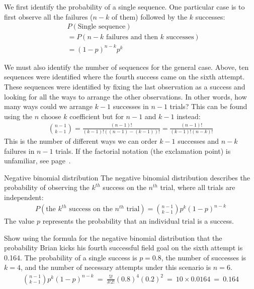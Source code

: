 We first identify the probability of a single sequence. One particular case is to first observe all the failures ($n-k$ of them) followed by the $k$ successes:
\begin{align*}
&P(\text{Single sequence}) \\
&= P(\text{$n-k$ failures and then $k$ successes}) \\
&= (1-p)^{n-k} p^{k}
\end{align*}

We must also identify the number of sequences for the general case. Above, ten sequences were identified where the fourth success came on the sixth attempt. These sequences were identified by fixing the last observation as a success and looking for all the ways to arrange the other observations. In other words, how many ways could we arrange $k-1$ successes in $n-1$ trials? This can be found using the $n$ choose $k$ coefficient but for $n-1$ and $k-1$ instead:
\begin{align*}
{n-1 \choose k-1} = \frac{(n-1)!}{(k-1)! \left((n-1) - (k-1)\right)!} = \frac{(n-1)!}{(k-1)! \left(n - k\right)!}
\end{align*}
This is the number of different ways we can order $k-1$ successes and $n-k$ failures in $n-1$ trials. If the factorial notation (the exclamation point) is unfamiliar, see page~\pageref{factorialDefinitionInTheBinomialSection}.

\begin{onebox}{Negative binomial distribution}
  The negative binomial distribution describes the
  probability of observing the $k^{th}$ success on
  the $n^{th}$ trial, where all trials are independent:
  \begin{align*}
  P(\text{the $k^{th}$ success on the $n^{th}$ trial})
      = {n-1 \choose k-1} p^{k}(1-p)^{n-k}
  \end{align*}
  The value $p$ represents the probability that
  an individual trial is a success.
\end{onebox}

\begin{examplewrap}
\begin{nexample}{Show using the formula for the negative binomial distribution that the probability Brian kicks his fourth successful field goal on the sixth attempt is 0.164.}
The probability of a single success is $p=0.8$, the number of successes is $k=4$, and the number of necessary attempts under this scenario is $n=6$.
\begin{align*}
{n-1 \choose k-1}p^k(1-p)^{n-k}\ 
	=\ \frac{5!}{3!2!} (0.8)^4 (0.2)^2\ 
	=\ 10\times 0.0164\ 
	=\ 0.164
\end{align*}
\end{nexample}
\end{examplewrap}

